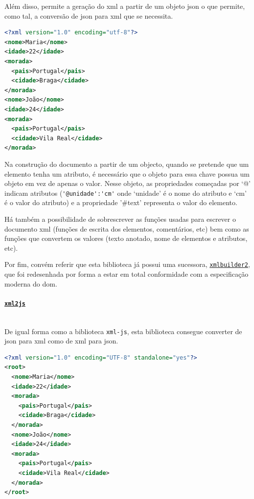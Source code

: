 Além disso, permite a geração do \acrshort{xml} a partir de um objeto \acrshort{json} o que permite, como tal, a conversão de \acrshort{json} para \acrshort{xml} que se necessita.

\begin{lstlisting}[language=xml, caption=Resultado da conversão do exemplo~\ref{exem:jsonBib} usando o conversor \texttt{xmlbuilder}]
<?xml version="1.0" encoding="utf-8"?>
<nome>Maria</nome>
<idade>22</idade>
<morada>
  <pais>Portugal</pais>
  <cidade>Braga</cidade>
</morada>
<nome>João</nome>
<idade>24</idade>
<morada>
  <pais>Portugal</pais>
  <cidade>Vila Real</cidade>
</morada>
\end{lstlisting}

Na construção do documento a partir de um objecto, quando se pretende que um elemento tenha um atributo, é necessário que o objeto para essa chave possua um objeto em vez de apenas o valor. Nesse objeto, as propriedades começadas por `@' indicam atributos (\verb|'@unidade':'cm'| onde `unidade' é o nome do atributo e `cm' é o valor do atributo) e a propriedade '\#text' representa o valor do elemento.

Há também a possibilidade de sobrescrever as funções usadas para escrever o documento \acrshort{xml} (funções de escrita dos elementos, comentários, etc) bem como as funções que convertem os valores (texto anotado, nome de elementos e atributos, etc).

Por fim, convém referir que esta biblioteca já possui uma sucessora, \href{https://www.npmjs.com/package/xmlbuilder2}{\texttt{xmlbuilder2}}, que foi redesenhada por forma a estar em total conformidade com a especificação moderna do \acrshort{dom}.

\paragraph{\href{https://www.npmjs.com/package/xml2js}{\texttt{xml2js}}} \mbox{} \\

De igual forma como a biblioteca \texttt{xml-js}, esta biblioteca consegue converter de \acrshort{json} para \acrshort{xml} como de \acrshort{xml} para \acrshort{json}. 

\begin{lstlisting}[language=xml, caption=Resultado da conversão do exemplo~\ref{exem:jsonBib} usando o conversor \texttt{xml2js}]
<?xml version="1.0" encoding="UTF-8" standalone="yes"?>
<root>
  <nome>Maria</nome>
  <idade>22</idade>
  <morada>
    <pais>Portugal</pais>
    <cidade>Braga</cidade>
  </morada>
  <nome>João</nome>
  <idade>24</idade>
  <morada>
    <pais>Portugal</pais>
    <cidade>Vila Real</cidade>
  </morada>
</root>
\end{lstlisting}

